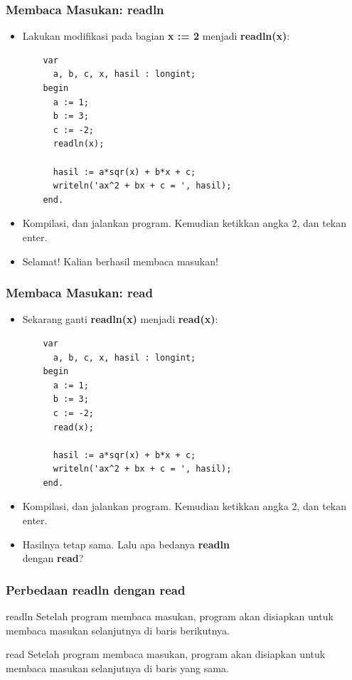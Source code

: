 \begin{frame}[fragile]
\frametitle{Membaca Masukan: readln}
\begin{itemize}
  \item Lakukan modifikasi pada bagian \textbf{x := 2} menjadi \textbf{readln(x)}:
  \begin{lstlisting}
    var
      a, b, c, x, hasil : longint;
    begin
      a := 1;
      b := 3;
      c := -2;
      readln(x);

      hasil := a*sqr(x) + b*x + c;
      writeln('ax^2 + bx + c = ', hasil);
    end.
  \end{lstlisting}
  \item Kompilasi, dan jalankan program. Kemudian ketikkan angka 2, dan tekan enter.
  \item Selamat! Kalian berhasil membaca masukan!
\end{itemize}
\end{frame}

\begin{frame}[fragile]
\frametitle{Membaca Masukan: read}
\begin{itemize}
  \item Sekarang ganti \textbf{readln(x)} menjadi \textbf{read(x)}:
  \begin{lstlisting}
    var
      a, b, c, x, hasil : longint;
    begin
      a := 1;
      b := 3;
      c := -2;
      read(x);

      hasil := a*sqr(x) + b*x + c;
      writeln('ax^2 + bx + c = ', hasil);
    end.
  \end{lstlisting}
  \item Kompilasi, dan jalankan program. Kemudian ketikkan angka 2, dan tekan enter.
  \item Hasilnya tetap sama. Lalu apa bedanya \textbf{readln} \\ dengan \textbf{read}?
\end{itemize}
\end{frame}

\begin{frame}[fragile]
\frametitle{Perbedaan readln dengan read}
\begin{block}{readln}
  Setelah program membaca masukan, program akan disiapkan untuk membaca masukan selanjutnya di \alert{baris berikutnya}.
\end{block}
\begin{block}{read}
  Setelah program membaca masukan, program akan disiapkan untuk membaca masukan selanjutnya di \alert{baris yang sama}.
\end{block}
\end{frame}

